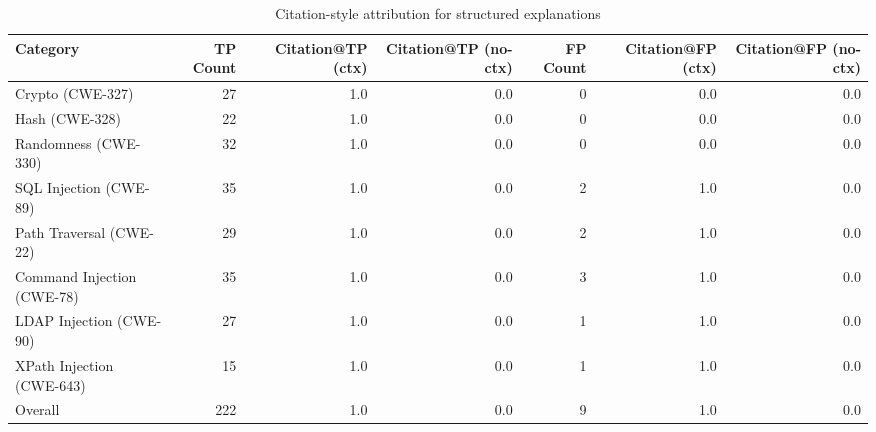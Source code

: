 \begin{table}[h]
\centering
\begin{tabular}{lrrrrrr}
\hline
Category & TP Count & Citation@TP (ctx) & Citation@TP (no-ctx) & FP Count & Citation@FP (ctx) & Citation@FP (no-ctx) \\
\hline
Crypto (CWE-327) & 27 & 1.0 & 0.0 & 0 & 0.0 & 0.0 \\
Hash (CWE-328) & 22 & 1.0 & 0.0 & 0 & 0.0 & 0.0 \\
Randomness (CWE-330) & 32 & 1.0 & 0.0 & 0 & 0.0 & 0.0 \\
SQL Injection (CWE-89) & 35 & 1.0 & 0.0 & 2 & 1.0 & 0.0 \\
Path Traversal (CWE-22) & 29 & 1.0 & 0.0 & 2 & 1.0 & 0.0 \\
Command Injection (CWE-78) & 35 & 1.0 & 0.0 & 3 & 1.0 & 0.0 \\
LDAP Injection (CWE-90) & 27 & 1.0 & 0.0 & 1 & 1.0 & 0.0 \\
XPath Injection (CWE-643) & 15 & 1.0 & 0.0 & 1 & 1.0 & 0.0 \\
Overall & 222 & 1.0 & 0.0 & 9 & 1.0 & 0.0 \\
\hline
\end{tabular}
\caption{Citation-style attribution for structured explanations}
\end{table}
